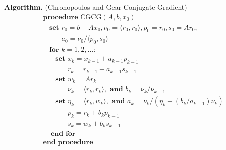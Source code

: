 \textbf{Algorithm.} (Chronopoulos and Gear Conjugate Gradient)
\begin{align*}
&\textbf{procedure}\text{ CGCG}( A,b,x_0 ) 
\\[-.4em]&~~~~\textbf{set } r_0 = b-Ax_0, \nu_0 = \langle r_0,r_0 \rangle, p_0 = r_0, s_0 = Ar_0, 
\\[-.4em]&~~~~\phantom{\textbf{set }}a_0 = \nu_0 / \langle p_0,s_0 \rangle
\\[-.4em]&~~~~\textbf{for } k=1,2,\ldots \textbf{:} 
\\[-.4em]&~~~~~~~~\textbf{set } x_k = x_{k-1} + a_{k-1} p_{k-1} 
\\[-.4em]&~~~~~~~~\phantom{\textbf{set }} r_k = r_{k-1} - a_{k-1} s_{k-1} 
\\[-.4em]&~~~~~~~~\textbf{set } w_k = Ar_k 
\\[-.4em]&~~~~~~~~\phantom{\textbf{set }} \nu_{k} = \langle r_k,r_k \rangle, \textbf{ and } b_k = \nu_k / \nu_{k-1}
\\[-.4em]&~~~~~~~~\textbf{set }\eta_k = \langle r_k, w_k \rangle, \textbf{ and } a_k = \nu_k / (\eta_k - (b_k/a_{k-1})\nu_k)
\\[-.4em]&~~~~~~~~\phantom{\textbf{set }} p_k = r_k + b_k p_{k-1}
\\[-.4em]&~~~~~~~~\phantom{\textbf{set }} s_k = w_k + b_k s_{k-1}
\\[-.4em]&~~~~~\textbf{end for}
\\[-.4em]&\textbf{end procedure}
\end{align*}


